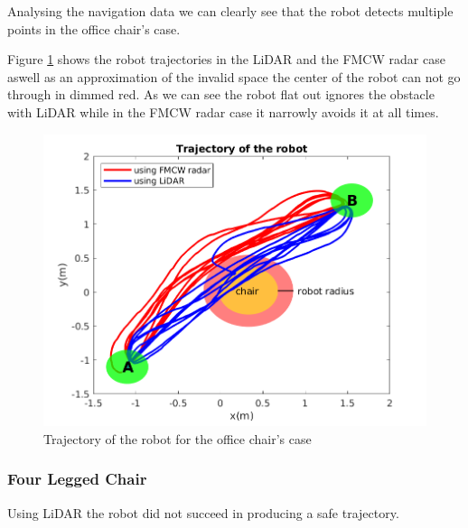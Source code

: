 Analysing the navigation data we can clearly see that the robot detects multiple points in the office chair's case.

Figure \ref{fig:traj1} shows the robot trajectories in the \ac{LiDAR} and the \ac{FMCW} radar case aswell as an approximation of the invalid space the  center of the robot can not go through in dimmed red. As we can see the robot flat out ignores the obstacle with \ac{LiDAR} while in the \ac{FMCW} \ac{radar} case it narrowly avoids it at all times.
\begin{figure}[ht!]
\centerline{\includegraphics [width=0.7 \textwidth]{imgs/chapter5/traj1.png}}
\caption{Trajectory of the robot for the office chair's case}
\label{fig:traj1}
\end{figure}


\subsubsection{Four Legged Chair}
Using \ac{LiDAR} the robot did not succeed in producing a safe trajectory.

